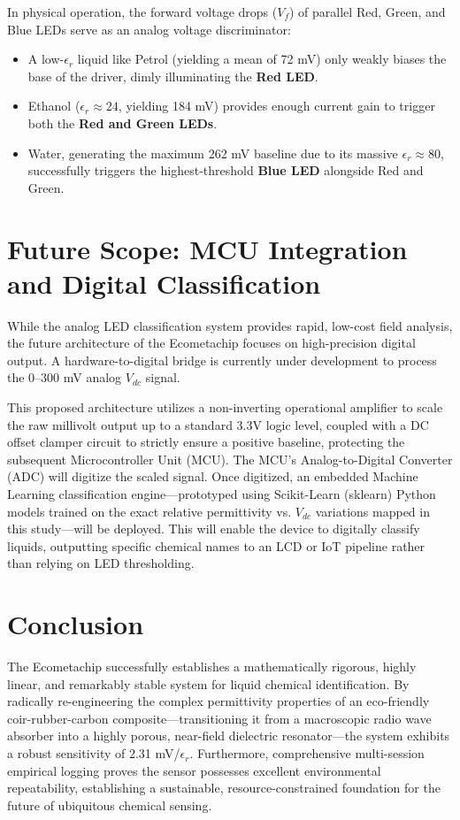 \documentclass[11pt, a4paper]{article}
\begin{document}
In physical operation, the forward voltage drops ($V_f$) of parallel Red, Green, and Blue LEDs serve as an analog voltage discriminator:
\begin{itemize}
    \item A low-$\epsilon_r$ liquid like Petrol (yielding a mean of 72 mV) only weakly biases the base of the driver, dimly illuminating the \textbf{Red LED}.
    \item Ethanol ($\epsilon_r \approx 24$, yielding 184 mV) provides enough current gain to trigger both the \textbf{Red and Green LEDs}.
    \item Water, generating the maximum 262 mV baseline due to its massive $\epsilon_r \approx 80$, successfully triggers the highest-threshold \textbf{Blue LED} alongside Red and Green.
\end{itemize}

\vspace*{20pt}
\section{Future Scope: MCU Integration and Digital Classification}
While the analog LED classification system provides rapid, low-cost field analysis, the future architecture of the Ecometachip focuses on high-precision digital output. A hardware-to-digital bridge is currently under development to process the 0--300 mV analog $V_{dc}$ signal.

This proposed architecture utilizes a non-inverting operational amplifier to scale the raw millivolt output up to a standard 3.3V logic level, coupled with a DC offset clamper circuit to strictly ensure a positive baseline, protecting the subsequent Microcontroller Unit (MCU). The MCU's Analog-to-Digital Converter (ADC) will digitize the scaled signal. Once digitized, an embedded Machine Learning classification engine---prototyped using Scikit-Learn (sklearn) Python models trained on the exact relative permittivity vs. $V_{dc}$ variations mapped in this study---will be deployed. This will enable the device to digitally classify liquids, outputting specific chemical names to an LCD or IoT pipeline rather than relying on LED thresholding.

\section{Conclusion}
The Ecometachip successfully establishes a mathematically rigorous, highly linear, and remarkably stable system for liquid chemical identification. By radically re-engineering the complex permittivity properties of an eco-friendly coir-rubber-carbon composite---transitioning it from a macroscopic radio wave absorber into a highly porous, near-field dielectric resonator---the system exhibits a robust sensitivity of 2.31 mV/$\epsilon_r$. Furthermore, comprehensive multi-session empirical logging proves the sensor possesses excellent environmental repeatability, establishing a sustainable, resource-constrained foundation for the future of ubiquitous chemical sensing.
\end{document}
